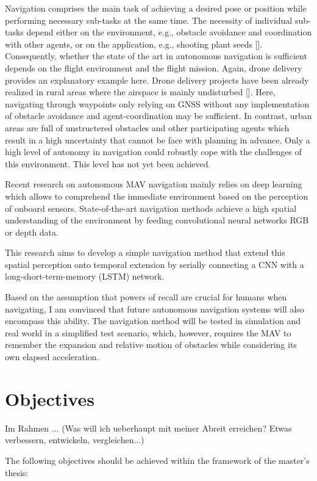 Navigation
comprises the main task of achieving a desired pose or position
while performing necessary sub-tasks at the same time.
The necessity of individual sub-tasks depend either on the environment,
e.g., obstacle avoidance and coordination with other agents,
or on the application,
e.g., shooting plant seeds [].
Consequently, 
whether the state of the art in autonomous navigation
is sufficient depends on the flight environment and the flight mission. 
Again, drone delivery provides an explanatory example here.
Drone delivery projects have been already 
realized in rural areas where the airspace is mainly undisturbed [].
Here, navigating through waypoints only relying on GNSS 
without any implementation of obstacle avoidance and agent-coordination may be sufficient. 
In contrast, urban areas are full of unstructered obstacles and other participating agents 
which result in a high uncertainty that cannot be face with planning in advance. 
Only a high level of autonomy in navigation
could robustly cope with the challenges of this environment.
This level has not yet been achieved.


Recent research on autonomous MAV navigation mainly relies on deep learning 
which allows to comprehend the immediate environment based on the perception of
onboard sensors.
State-of-the-art navigation methods 
achieve a high spatial understanding of the environment
by feeding convolutional neural networks RGB or depth data.

This research aims to develop a simple navigation method 
that extend this spatial perception onto temporal extension 
by serially connecting a CNN with a long-short-term-memory (LSTM) network.

Based on the assumption that powers of recall are crucial for humans when navigating,
I am convinced that future autonomous navigation systems will also encompass this ability.
The navigation method will be tested in simulation and real world in a simplified test scenario,
which, however, requires the MAV to remember the expansion and relative motion of obstacles while considering its own elapsed acceleration.




\chapter{Objectives}
Im Rahmen ... (Was will ich ueberhaupt mit meiner Abreit erreichen? Etwas verbessern, entwickeln, vergleichen...)

 
The following objectives should be achieved within the framework of the master's thesis:




